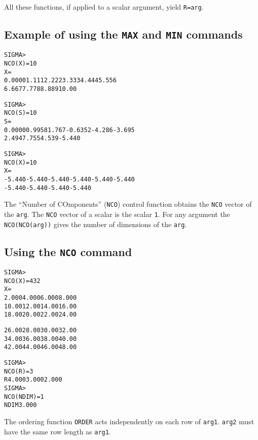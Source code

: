 All these functions, if applied to a scalar argument, yield \texttt{R=arg}.

\subsection*{Example of using the \texttt{MAX} and \texttt{MIN}
  commands}
\begin{alltt}
  SIGMA > 
  NCO(X       )=   10
  X       =
   0.0000      1.111      2.222      3.333      4.444      5.556
    6.667      7.778      8.889      10.00
 
  SIGMA > 
  NCO(S       )=   10
  S       =
   0.0000     0.9958      1.767    -0.6352     -4.286     -3.695
    2.494      7.755      4.539     -5.440
 
  SIGMA > 
  NCO(X       )=   10
  X       =
   -5.440     -5.440     -5.440     -5.440     -5.440     -5.440
   -5.440     -5.440     -5.440     -5.440
\end{alltt}

 
The ``Number of COmponents'' (\texttt{NCO}) control
function obtains the \texttt{NCO} vector of the \texttt{arg}. 
The \texttt{NCO} vector of a scalar is the scalar \texttt{1}.
For any argument the \texttt{NCO(NCO(arg))} gives the number 
of dimensions of the \texttt{arg}.

\subsection*{Using the \texttt{NCO} command}
\begin{alltt}
 SIGMA > 
 NCO(X       )=    4    3    2
 X       =
   2.000      4.000      6.000      8.000
   10.00      12.00      14.00      16.00
   18.00      20.00      22.00      24.00
 
   26.00      28.00      30.00      32.00
   34.00      36.00      38.00      40.00
   42.00      44.00      46.00      48.00
 
 SIGMA > 
 NCO(R       )=    3
 R         4.000      3.000      2.000
 SIGMA > 
 NCO(NDIM    )=    1
 NDIM      3.000
\end{alltt}

 
The ordering function \texttt{ORDER} acts independently on each row
of \texttt{arg1}. \texttt{arg2} must have the same row length as \texttt{arg1}.
 
